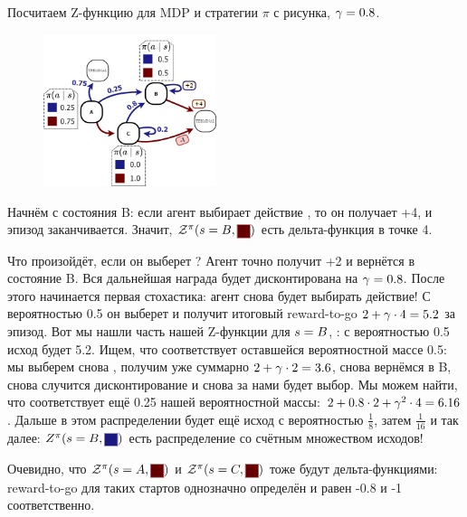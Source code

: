 \begin{exampleBox}[label=ex:zfunction]{}
Посчитаем Z-функцию для MDP и стратегии $\pi$ с рисунка, $\gamma \HM= 0.8$.

\begin{figure}
\vspace{-0.4cm}
\centering
\includegraphics[width=0.45\textwidth]{Images/Value.png}
\vspace{-0.4cm}
\end{figure}

Начнём с состояния B: если агент выбирает действие , то он получает +4, и эпизод заканчивается. Значит, $\Z^{\pi}(s \HM= B, \colorsquare{ChadRed})$ есть дельта-функция в точке 4.

Что произойдёт, если он выберет ? Агент точно получит +2 и вернётся в состояние B. Вся дальнейшая награда будет дисконтирована на $\gamma \HM= 0.8$. После этого начинается первая стохастика: агент снова будет выбирать действие! С вероятностью 0.5 он выберет  и получит итоговый reward-to-go $2 \HM+ \gamma \cdot 4 \HM= 5.2$ за эпизод. Вот мы нашли часть нашей Z-функции для $s \HM= B$, : с вероятностью 0.5 исход будет 5.2. Ищем, что соответствует оставшейся вероятностной массе 0.5: мы выберем снова , получим уже суммарно $2 \HM+ \gamma \cdot 2 \HM= 3.6$, снова вернёмся в B, снова случится дисконтирование и снова за нами будет выбор. Мы можем найти, что соответствует ещё 0.25 нашей вероятностной массы: $2 \HM+ 0.8 \cdot 2 + \gamma^2 \cdot 4 \HM= 6.16$. Дальше в этом распределении будет ещё исход с вероятностью $\frac{1}{8}$, затем $\frac{1}{16}$ и так далее: $Z^{\pi}(s \HM= B, \colorsquare{ChadBlue})$ есть распределение со счётным множеством исходов!

Очевидно, что $\Z^{\pi}(s \HM= A, \text{\colorsquare{ChadRed}})$ и $\Z^{\pi}(s \HM= C, \text{\colorsquare{ChadRed}})$ тоже будут дельта-функциями: reward-to-go для таких стартов однозначно определён и равен -0.8 и -1 соответственно. 


\end{exampleBox}
